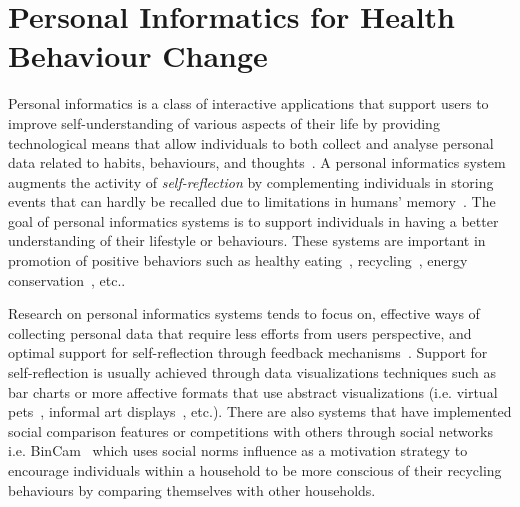 \section{Personal Informatics for Health Behaviour Change}
Personal informatics is a class of interactive applications that support users to improve self-understanding of various aspects of their life by providing technological means that allow individuals to both collect and analyse personal data related to habits, behaviours, and thoughts~\citep{li2011personal,li2012personal}. A personal informatics system augments the activity of \emph{self-reflection} by complementing individuals in storing events that can hardly be recalled due to limitations in humans' memory~\citep{li2010stage}. The goal of personal informatics systems is to support individuals in having a better understanding of their lifestyle or behaviours. These systems are important in promotion of positive behaviors such as healthy eating~\citep{lee2006pmeb}, recycling~\citep{comber2013designing}, energy conservation~\citep{seligman1977feedback}, etc..

Research on personal informatics systems tends to focus on, effective ways of collecting personal data that require less efforts from users perspective, and optimal support for self-reflection through feedback mechanisms~\citep{li2011understanding}. Support for self-reflection is usually achieved through data visualizations techniques such as bar charts or more affective formats that use abstract visualizations (i.e. virtual pets~\citep{lin2006:fish}, informal art displays~\citep{fan2012spark}, etc.). There are also systems that have implemented social comparison features or competitions with others through social networks i.e. BinCam~\citep{comber2013bincam,comber2013designing} which uses social norms influence as a motivation strategy to encourage individuals within a household to be more conscious of their recycling behaviours by comparing themselves with other households.


